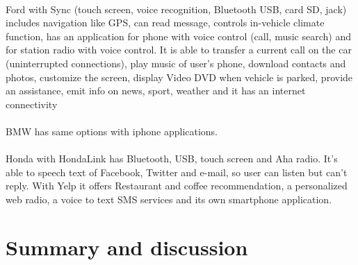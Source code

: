 \documentclass[a4paper]{article}
\begin{document}
\paragraph{}
Ford with Sync (touch screen, voice recognition, Bluetooth USB, card SD, jack) includes navigation like GPS, can read message, controls in-vehicle climate function, has an application for phone with voice control (call, music search) and for station radio with voice control. It is able to transfer a current call on the car (uninterrupted connections), play music of user's phone, download contacts and photos, customize the screen, display Video DVD when vehicle is parked, provide an assistance, emit info on news, sport, weather and it has an internet connectivity 
\paragraph{}
BMW has same options with iphone applications. \paragraph{}
Honda with HondaLink has Bluetooth, USB, touch screen and Aha radio. It's able to speech text of Facebook, Twitter and e-mail, so user can listen but can't reply. With Yelp it offers Restaurant and coffee recommendation, a personalized web radio, a voice to text SMS services and its own smartphone application.










 \section{Summary and discussion}
\end{document}

